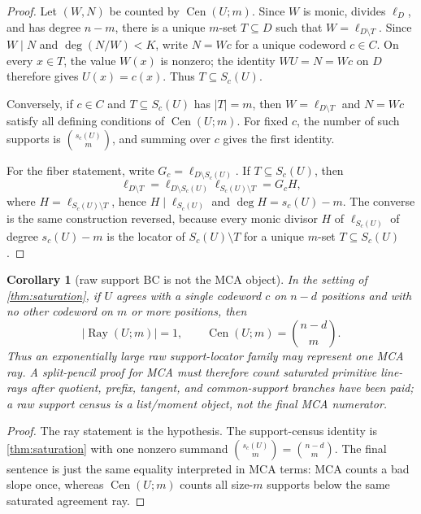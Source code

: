 \documentclass[a4paper,11pt]{amsart}
\newtheorem{corollary}[theorem]{Corollary}
\theoremstyle{remark}
\newcommand{\Cen}{\operatorname{Cen}}
\begin{document}
\begin{proof}
Let \((W,N)\) be counted by \(\Cen(U;m)\).  Since \(W\) is monic, divides \(\ell_D\), and has degree \(n-m\), there is a unique \(m\)-set \(T\subseteq D\) such that \(W=\ell_{D\setminus T}\).  Since \(W\mid N\) and \(\deg(N/W)<K\), write \(N=Wc\) for a unique codeword \(c\in C\).  On every \(x\in T\), the value \(W(x)\) is nonzero; the identity \(WU=N=Wc\) on \(D\) therefore gives \(U(x)=c(x)\).  Thus \(T\subseteq S_c(U)\).

Conversely, if \(c\in C\) and \(T\subseteq S_c(U)\) has \(|T|=m\), then \(W=\ell_{D\setminus T}\) and \(N=Wc\) satisfy all defining conditions of \(\Cen(U;m)\).  For fixed \(c\), the number of such supports is \(\binom{s_c(U)}m\), and summing over \(c\) gives the first identity.

For the fiber statement, write \(G_c=\ell_{D\setminus S_c(U)}\).  If \(T\subseteq S_c(U)\), then
\[
        \ell_{D\setminus T}
        =\ell_{D\setminus S_c(U)}\ell_{S_c(U)\setminus T}
        =G_cH,
\]
where \(H=\ell_{S_c(U)\setminus T}\), hence \(H\mid\ell_{S_c(U)}\) and \(\deg H=s_c(U)-m\).  The converse is the same construction reversed, because every monic divisor \(H\) of \(\ell_{S_c(U)}\) of degree \(s_c(U)-m\) is the locator of \(S_c(U)\setminus T\) for a unique \(m\)-set \(T\subseteq S_c(U)\).
\end{proof}

\begin{corollary}[raw support BC is not the MCA object]\label{cor:raw-bc-fails}
In the setting of \cref{thm:saturation}, if \(U\) agrees with a single codeword \(c\) on \(n-d\) positions and with no other codeword on \(m\) or more positions, then
\[
        |\operatorname{Ray}(U;m)|=1,
        \qquad
        \Cen(U;m)=\binom{n-d}{m} .
\]
Thus an exponentially large raw support-locator family may represent one MCA ray.  A split-pencil proof for MCA must therefore count saturated primitive line-rays after quotient, prefix, tangent, and common-support branches have been paid; a raw support census is a list/moment object, not the final MCA numerator.
\end{corollary}

\begin{proof}
The ray statement is the hypothesis.  The support-census identity is \cref{thm:saturation} with one nonzero summand \(\binom{s_c(U)}m=\binom{n-d}m\).  The final sentence is just the same equality interpreted in MCA terms: MCA counts a bad slope once, whereas \(\Cen(U;m)\) counts all size-\(m\) supports below the same saturated agreement ray.
\end{proof}
\end{document}
